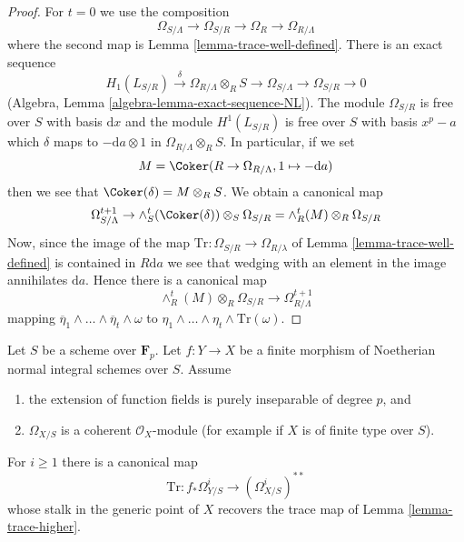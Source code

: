 \begin{proof}
For $t = 0$ we use the composition
$$
\Omega_{S/\Lambda} \to \Omega_{S/R} \to \Omega_R \to \Omega_{R/\Lambda}
$$
where the second map is Lemma \ref{lemma-trace-well-defined}.
There is an exact sequence
$$
H_1(L_{S/R}) \xrightarrow{\delta} \Omega_{R/\Lambda} \otimes_R S \to
\Omega_{S/\Lambda} \to \Omega_{S/R} \to 0
$$
(Algebra, Lemma \ref{algebra-lemma-exact-sequence-NL}).
The module $\Omega_{S/R}$ is free over $S$ with basis $\text{d}x$
and the module $H^1(L_{S/R})$ is free over $S$ with basis $x^p - a$
which $\delta$ maps to $-\text{d}a \otimes 1$ in
$\Omega_{R/\Lambda} \otimes_R S$. In particular, if we set
$$
M = \Coker(R \to \Omega_{R/\Lambda}, 1 \mapsto -\text{d}a)
$$
then we see that $\Coker(\delta) = M \otimes_R S$. We obtain a
canonical map
$$
\Omega^{t + 1}_{S/\Lambda} \to
\wedge_S^t(\Coker(\delta)) \otimes_S \Omega_{S/R} =
\wedge^t_R(M) \otimes_R \Omega_{S/R}
$$
Now, since the image of the map
$\text{Tr} : \Omega_{S/R} \to \Omega_{R/\lambda}$
of Lemma \ref{lemma-trace-well-defined} is contained in $R\text{d}a$ we
see that wedging with an element in the image annihilates $\text{d}a$.
Hence there is a canonical map
$$
\wedge^t_R(M) \otimes_R \Omega_{S/R} \to \Omega_{R/\Lambda}^{t + 1}
$$
mapping
$\overline{\eta}_1 \wedge \ldots \wedge \overline{\eta}_t \wedge \omega$
to $\eta_1 \wedge \ldots \wedge \eta_t \wedge \text{Tr}(\omega)$.
\end{proof}

\begin{lemma}
\label{lemma-trace-extends}
Let $S$ be a scheme over $\mathbf{F}_p$. Let $f : Y \to X$ be a finite morphism
of Noetherian normal integral schemes over $S$. Assume
\begin{enumerate}
\item the extension of function fields is purely inseparable of degree $p$, and
\item $\Omega_{X/S}$ is a coherent $\mathcal{O}_X$-module (for example
if $X$ is of finite type over $S$).
\end{enumerate}
For $i \geq 1$ there is a canonical map
$$
\text{Tr} : f_*\Omega^i_{Y/S} \longrightarrow (\Omega_{X/S}^i)^{**}
$$
whose stalk in the generic point of $X$ recovers the trace map of
Lemma \ref{lemma-trace-higher}.
\end{lemma}


